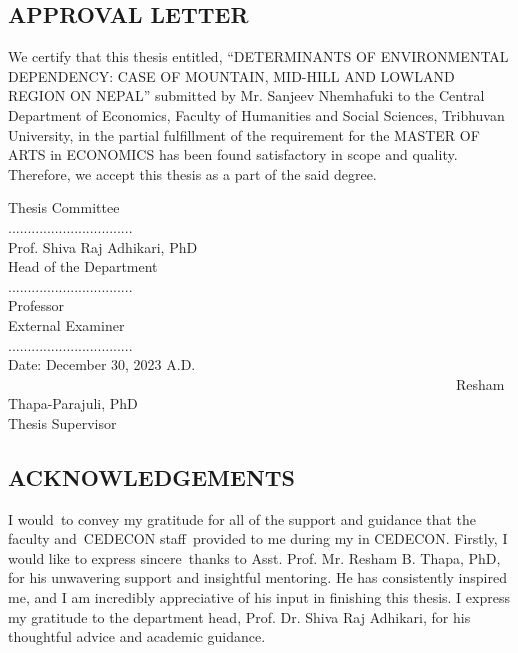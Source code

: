 \documentclass[12pt]{report}
\begin{document}
\newpage %
\begin{center}
\section*{APPROVAL LETTER}
\end{center}
\renewcommand{\thepage}{\roman{page}}
\setcounter{page}{3}
We certify that this thesis entitled, “DETERMINANTS OF ENVIRONMENTAL DEPENDENCY: CASE OF MOUNTAIN, MID-HILL AND LOWLAND REGION ON NEPAL” submitted by Mr. Sanjeev Nhemhafuki to the Central Department of Economics, Faculty of Humanities and Social Sciences, Tribhuvan University, in the partial fulfillment of the requirement for the  MASTER OF ARTS in ECONOMICS has been found satisfactory in scope and quality. Therefore, we accept this thesis as a part of the said degree.
\vspace{2cm}

\begin{flushright}
Thesis Committee 
\vspace{1cm} \\
    ................................\\
Prof. Shiva Raj Adhikari, PhD \\
 Head of the Department 
\vspace{1cm} \\
................................\\
Professor \\
External Examiner 
\vspace{1cm} \\
................................\\
 Date: December 30, 2023 A.D. \ \ \ \ \ \ \ \ \ \ \ \ \ \ \ \ \ \ \ \ \ \ \ \ \ \ \ \ \ \ \ \ \ \ \ \ \ \ \ \ \ \ \  \ \ \ \ \ \ \ \ \ \ \ \ \ \ \ \ \ \ \ \ \   ReshamThapa-Parajuli, PhD\\
    Thesis Supervisor

\end{flushright}
\newpage %
\begin{center}
\section*{ACKNOWLEDGEMENTS}
\end{center}
\renewcommand{\thepage}{\roman{page}}
\setcounter{page}{4}
I would to convey my gratitude for all of the support and guidance that the faculty and CEDECON staff provided to me during my in CEDECON. Firstly, I would like to express sincere thanks to Asst. Prof. Mr. Resham B. Thapa, PhD, for his unwavering support and insightful mentoring. He has consistently inspired me, and I am incredibly appreciative of his input in finishing this thesis. I express my gratitude to the department head, Prof. Dr. Shiva Raj Adhikari, for his thoughtful advice and academic guidance. 
\end{document}
